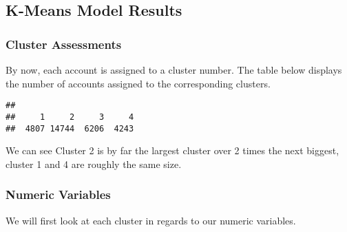 \documentclass[]{article}
\newenvironment{Shaded}{\begin{snugshade}}{\end{snugshade}}
\newcommand{\KeywordTok}[1]{\textcolor[rgb]{0.13,0.29,0.53}{\textbf{#1}}}
\newcommand{\CommentTok}[1]{\textcolor[rgb]{0.56,0.35,0.01}{\textit{#1}}}
\newcommand{\OperatorTok}[1]{\textcolor[rgb]{0.81,0.36,0.00}{\textbf{#1}}}
\newcommand{\NormalTok}[1]{#1}
\begin{document}
\subsection{K-Means Model Results}\label{k-means-model-results}

\subsubsection{Cluster Assessments}\label{cluster-assessments}

By now, each account is assigned to a cluster number. The table below
displays the number of accounts assigned to the corresponding clusters.

\begin{Shaded}
\end{Shaded}

\begin{verbatim}
## 
##     1     2     3     4 
##  4807 14744  6206  4243
\end{verbatim}

We can see Cluster 2 is by far the largest cluster over 2 times the next
biggest, cluster 1 and 4 are roughly the same size.

\subsubsection{Numeric Variables}\label{numeric-variables}

We will first look at each cluster in regards to our numeric variables.
\end{document}
